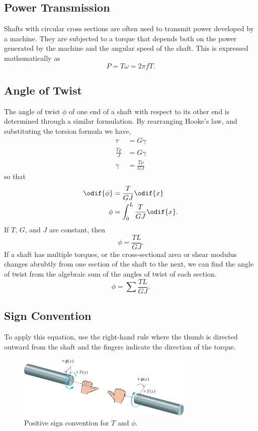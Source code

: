 \documentclass{article}
\begin{document}
\subsection{Power Transmission}
Shafts with circular cross sections are often used to transmit power developed by a machine.
They are subjected to a torque that depends both on the power generated by the machine and the angular speed
of the shaft. This is expressed mathematically as
\begin{equation*}
    P = T \omega = 2 \pi f T.
\end{equation*}
\subsection{Angle of Twist}
The angle of twist \(\phi\) of one end of a shaft with respect to its other end is determined through a similar formulation.
By rearranging Hooke's law, and substituting the torsion formula we have,
\begin{align*}
    \tau            & = G \gamma         \\
    \frac{T\rho}{J} & = G \gamma         \\
    \gamma          & = \frac{T\rho}{GJ}
\end{align*}
so that
\begin{align*}
    \odif{\phi} & = \frac{T}{GJ} \odif{x}          \\
    \phi        & = \int_0^L \frac{T}{GJ} \odif{x}.
\end{align*}
If \(T\), \(G\), and \(J\) are constant, then
\begin{equation*}
    \phi = \frac{TL}{GJ}.
\end{equation*}
If a shaft has multiple torques, or the cross-sectional area or shear modulus changes 
abrubtly from one section of the shaft to the next, we can find the angle of twist from
the algebraic sum of the angles of twist of each section.
\begin{equation*}
    \phi = \sum \frac{TL}{GJ}.
\end{equation*}
\subsection{Sign Convention}
To apply this equation, use the right-hand rule where the thumb is directed outward from the shaft 
and the fingers indicate the direction of the torque.
\begin{figure}[H]
    \centering
    \includegraphics[height = 3cm, keepaspectratio = true]{figures/shaft_sign_convention.pdf}
    \caption{Positive sign convention for \(T\) and \(\phi\).} %
\end{figure}
\end{document}

